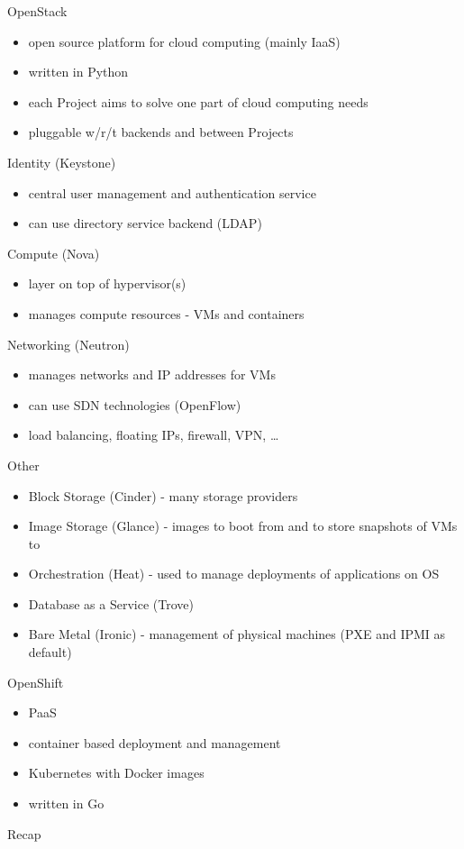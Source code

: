 \documentclass[presentation]{beamer}
\begin{document}
\begin{frame}[label={sec:org9d8f1fe}]{OpenStack}
\begin{itemize}
\item open source platform for cloud computing (mainly IaaS)
\item written in Python
\item each Project aims to solve one part of cloud computing needs
\item pluggable w/r/t backends and between Projects
\end{itemize}

\begin{block}{Identity (Keystone)}
\begin{itemize}
\item central user management and authentication service
\item can use directory service backend (LDAP)
\end{itemize}
\end{block}

\begin{block}{Compute (Nova)}
\begin{itemize}
\item layer on top of hypervisor(s)
\item manages compute resources - VMs and containers
\end{itemize}
\end{block}

\begin{block}{Networking (Neutron)}
\begin{itemize}
\item manages networks and IP addresses for VMs
\item can use SDN technologies (OpenFlow)
\item load balancing, floating IPs, firewall, VPN, \ldots{}
\end{itemize}
\end{block}

\begin{block}{Other}
\begin{itemize}
\item Block Storage (Cinder) - many storage providers
\item Image Storage (Glance) - images to boot from and to store snapshots of VMs to
\item Orchestration (Heat) - used to manage deployments of applications on OS
\item Database as a Service (Trove)
\item Bare Metal (Ironic) - management of physical machines (PXE and IPMI as default)
\end{itemize}
\end{block}
\end{frame}

\begin{frame}[label={sec:orgb69f6a1}]{OpenShift}
\begin{itemize}
\item PaaS
\item container based deployment and management
\item Kubernetes with Docker images
\item written in Go
\end{itemize}
\end{frame}

\begin{frame}[label={sec:org6cf8733}]{Recap}

\end{frame}
\end{document}
